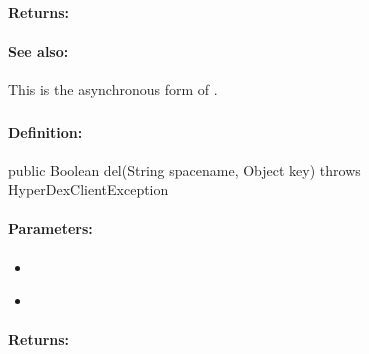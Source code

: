 \paragraph{Returns:}


\paragraph{See also:}  This is the asynchronous form of .

\pagebreak
\subsubsection{}
\label{api:java:del}


\paragraph{Definition:}
\begin{javacode}
public Boolean del(String spacename, Object key) throws HyperDexClientException
\end{javacode}

\paragraph{Parameters:}
\begin{itemize}[noitemsep]
\item {}\\

\item {}\\

\end{itemize}

\paragraph{Returns:}


\pagebreak
\subsubsection{}
\label{api:java:async_del}


